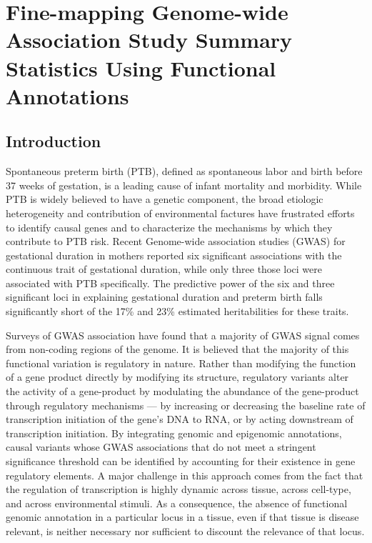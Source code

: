 \chapter{Fine-mapping Genome-wide Association Study Summary Statistics Using Functional Annotations}

\section{Introduction}\label{sec:org59556ac}

Spontaneous preterm birth (PTB), defined as spontaneous labor and birth before 37 weeks of gestation, is a leading cause of infant mortality and morbidity. While PTB is widely believed to have a genetic component, the broad etiologic heterogeneity and contribution of environmental factures have frustrated efforts to identify causal genes and to characterize the mechanisms by which they contribute to PTB risk\cite{crider2005genetic}.  Recent Genome-wide association studies (GWAS) for gestational duration in mothers reported six significant associations with the continuous trait of gestational duration, while only three those loci were associated with PTB specifically. The predictive power of the six and three significant loci in explaining gestational duration and preterm birth falls significantly short of the 17\% and 23\% estimated heritabilities for these traits.  

Surveys of GWAS association have found that a majority of GWAS signal comes from non-coding regions of the genome.  It is believed that the majority  of this functional variation is regulatory in nature.  Rather than modifying the function of a gene product directly by modifying its structure, regulatory variants alter the activity of a gene-product by modulating the abundance of the gene-product through regulatory mechanisms --- by increasing or decreasing the baseline rate of transcription initiation of the gene's DNA to RNA, or by acting downstream of transcription initiation.  By integrating genomic and epigenomic annotations, causal variants whose GWAS associations that do not meet a stringent significance threshold can be identified by accounting for their existence in gene regulatory elements.  A major challenge in this approach comes from the fact that the regulation of transcription is highly dynamic across tissue, across cell-type, and across environmental stimuli.  As a consequence, the absence of functional genomic annotation in a particular locus in a tissue, even if that tissue is disease relevant, is neither necessary nor sufficient to discount the relevance of that locus.  

